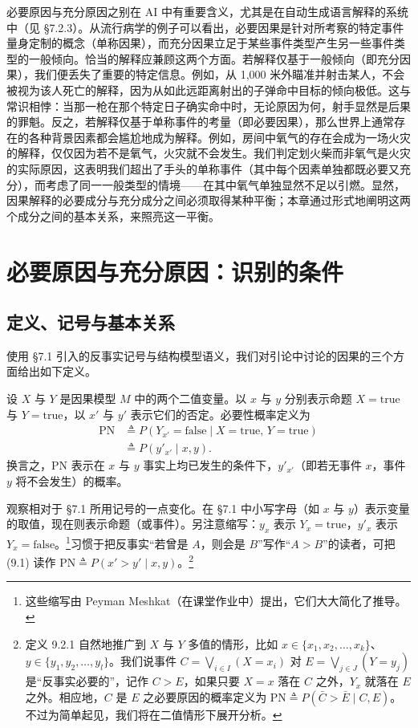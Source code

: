 必要原因与充分原因之别在 AI 中有重要含义，尤其是在自动生成语言解释的系统中（见 \S 7.2.3）。从流行病学的例子可以看出，必要因果是针对所考察的特定事件量身定制的概念（单称因果），而充分因果立足于某些事件类型产生另一些事件类型的一般倾向。恰当的解释应兼顾这两个方面。若解释仅基于一般倾向（即充分因果），我们便丢失了重要的特定信息。例如，从 1,000 米外瞄准并射击某人，不会被视为该人死亡的解释，因为从如此远距离射出的子弹命中目标的倾向极低。这与常识相悖：当那一枪在那个特定日子确实命中时，无论原因为何，射手显然是后果的罪魁。反之，若解释仅基于单称事件的考量（即必要因果），那么世界上通常存在的各种背景因素都会尴尬地成为解释。例如，房间中氧气的存在会成为一场火灾的解释，仅仅因为若不是氧气，火灾就不会发生。我们判定划火柴而非氧气是火灾的实际原因，这表明我们超出了手头的单称事件（其中每个因素单独都既必要又充分），而考虑了同一一般类型的情境——在其中氧气单独显然不足以引燃。显然，因果解释的必要成分与充分成分之间必须取得某种平衡；本章通过形式地阐明这两个成分之间的基本关系，来照亮这一平衡。

\section{必要原因与充分原因：识别的条件}

\subsection{定义、记号与基本关系}

使用 \S 7.1 引入的反事实记号与结构模型语义，我们对引论中讨论的因果的三个方面给出如下定义。

\begin{definition}[必要性概率，PN]
设 $X$ 与 $Y$ 是因果模型 $M$ 中的两个二值变量。以 $x$ 与 $y$ 分别表示命题 $X=\text{true}$ 与 $Y=\text{true}$，以 $x'$ 与 $y'$ 表示它们的否定。必要性概率定义为
\begin{equation}
\begin{aligned}
\mathrm{PN} &\triangleq P(Y_{x'}=\text{false}\mid X=\text{true},\,Y=\text{true})\\
&\triangleq P(y'_{x'}\mid x,y).
\end{aligned} \tag{9.1}
\end{equation}
换言之，PN 表示在 $x$ 与 $y$ 事实上均已发生的条件下，$y'_{x'}$（即若无事件 $x$，事件 $y$ 将不会发生）的概率。
\end{definition}

观察相对于 \S 7.1 所用记号的一点变化。在 \S 7.1 中小写字母（如 $x$ 与 $y$）表示变量的取值，现在则表示命题（或事件）。另注意缩写：$y_x$ 表示 $Y_x=\text{true}$，$y'_x$ 表示 $Y_x=\text{false}$。\footnote{这些缩写由 Peyman Meshkat（在课堂作业中）提出，它们大大简化了推导。}习惯于把反事实“若曾是 $A$，则会是 $B$”写作“$A>B$”的读者，可把 \textup{(9.1)} 读作 $\mathrm{PN}\triangleq P(x'>y'\mid x,y)$。\footnote{定义 9.2.1 自然地推广到 $X$ 与 $Y$ 多值的情形，比如 $x\in\{x_1,x_2,\dots,x_k\}$、$y\in\{y_1,y_2,\dots,y_l\}$。我们说事件 $C=\bigvee_{i\in I}(X=x_i)$ 对 $E=\bigvee_{j\in J}(Y=y_j)$ 是“反事实必要的”，记作 $C>E$，如果只要 $X=x$ 落在 $C$ 之外，$Y_x$ 就落在 $E$ 之外。相应地，$C$ 是 $E$ 之必要原因的概率定义为 $\mathrm{PN}\triangleq P(\bar{C}>\bar{E}\mid C,E)$。不过为简单起见，我们将在二值情形下展开分析。}

